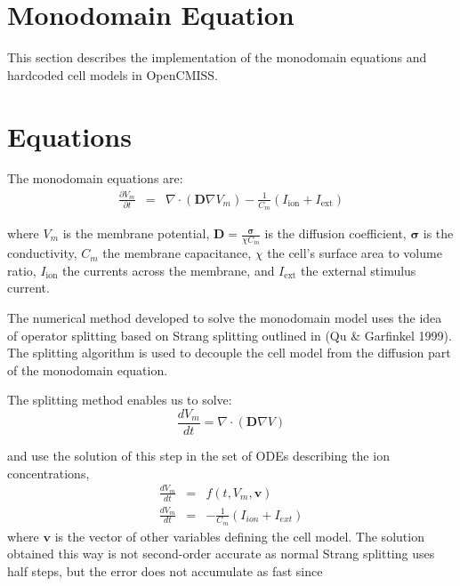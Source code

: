 
\section{Monodomain Equation}
 

\renewcommand{\vec}[1]{\boldsymbol{#1}}
\newcommand{\Iion}{I_{\text{ion}}}
\newcommand{\Iext}{I_{\text{ext}}}
\newcommand{\pd}[2]{\frac{\partial #1}{\partial #2}}
\newcommand{\lrbr}[1]{\left(#1\right)}
\newcommand{\dt}{\Delta t}



This section describes the implementation of the monodomain equations and hardcoded cell models in OpenCMISS.

\section{Equations}
The monodomain equations are:
\begin{eqnarray}
 \pd{V_m}{t}  &=&  \nabla \cdot \lrbr{\vec{D} \nabla V_m}  -  \frac{1}{C_m}\lrbr{\Iion + \Iext}
\end{eqnarray}

where $V_m$ is the membrane potential, $\vec{D}=\frac{\vec{\sigma}}{\chi C_m}$ is the diffusion coefficient, $\vec{\sigma}$ is the conductivity, $C_m$ the membrane capacitance, $\chi$ the cell's surface area to volume ratio, $\Iion$ the currents across the membrane, and $\Iext$ the external stimulus current.

The numerical method developed to solve the monodomain model uses the idea of operator splitting based on Strang splitting outlined in (Qu \& Garfinkel 1999). The splitting algorithm is used to decouple the cell model from the diffusion part of the monodomain equation. 

The splitting method enables us to solve:
\begin{equation}
\frac{d V_m}{d t} = \nabla \cdot (\mathbf{D}\nabla V)
\label{diff}
\end{equation}

and use the solution of this step in the set of ODEs describing the ion concentrations,
\begin{eqnarray}
\frac{d V_m}{d t} &=& f(t,V_m,\vec{v})\\
\frac{d V_m}{d t} &=&  - \frac{1}{C_m}(I_{ion} + I_{ext}) 
\end{eqnarray}
where $\vec{v}$ is the vector of other variables defining the cell model.
The solution obtained this way is not second-order accurate as normal Strang splitting uses half steps, but the error does not accumulate as
fast since

